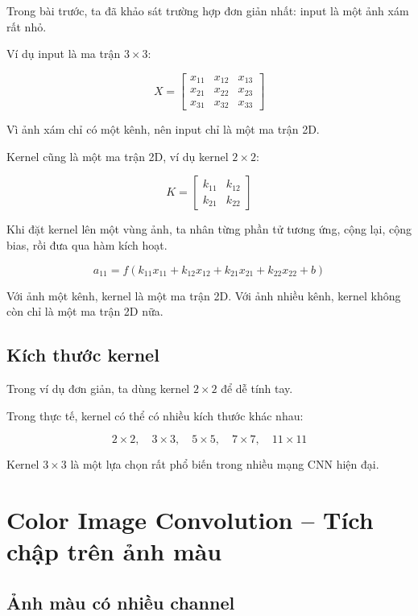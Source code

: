 Trong bài trước, ta đã khảo sát trường hợp đơn giản nhất: input là một ảnh xám rất nhỏ.

Ví dụ input là ma trận $3\times3$:

\[
    X =
    \begin{bmatrix}
    x_{11} & x_{12} & x_{13}\\
    x_{21} & x_{22} & x_{23}\\
    x_{31} & x_{32} & x_{33}
    \end{bmatrix}
\]

Vì ảnh xám chỉ có một kênh, nên input chỉ là một ma trận 2D.

Kernel cũng là một ma trận 2D, ví dụ kernel $2\times2$:

\[
    K =
    \begin{bmatrix}
    k_{11} & k_{12}\\
    k_{21} & k_{22}
    \end{bmatrix}
\]

Khi đặt kernel lên một vùng ảnh, ta nhân từng phần tử tương ứng, cộng lại, cộng bias, rồi đưa qua hàm kích hoạt.

\[
    a_{11}
    =
    f(
    k_{11}x_{11}
    +
    k_{12}x_{12}
    +
    k_{21}x_{21}
    +
    k_{22}x_{22}
    +
    b
    )
\]

\begin{ghinho}
Với ảnh một kênh, kernel là một ma trận 2D. Với ảnh nhiều kênh, kernel không còn chỉ là một ma trận 2D nữa.
\end{ghinho}

\subsection{Kích thước kernel}

Trong ví dụ đơn giản, ta dùng kernel $2\times2$ để dễ tính tay.

Trong thực tế, kernel có thể có nhiều kích thước khác nhau:

\[
    2\times2,\quad 3\times3,\quad 5\times5,\quad 7\times7,\quad 11\times11
\]

Kernel $3\times3$ là một lựa chọn rất phổ biến trong nhiều mạng CNN hiện đại.

\section{Color Image Convolution -- Tích chập trên ảnh màu}

\subsection{Ảnh màu có nhiều channel}

